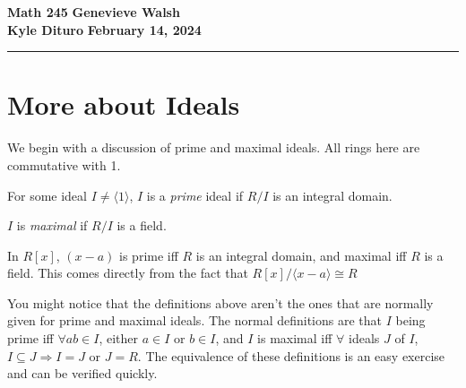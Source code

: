 \documentclass[12pt, twosided]{article}
\begin{document}
\noindent \textbf{Math 245} \hfill \textbf{Genevieve Walsh} \\
\textbf{Kyle Dituro} \hfill \textbf{February 14\tht, 2024}\hrule
\vspace{.2in}

\section{More about Ideals}
We begin with a discussion of prime and maximal ideals. All rings here are commutative with 1.

\begin{df}
  For some ideal \(I \neq \langle 1 \rangle\), \(I\) is a \textit{prime} ideal if \(R/I\) is an integral domain.

  \(I\) is \textit{maximal} if \(R/I\) is a field.
\end{df}

\begin{exa}
  In \(R[x]\), \((x-a)\) is prime iff \(R\) is an integral domain, and maximal iff \(R\) is a field. This comes directly from the fact that \(R[x]/\langle x-a \rangle \cong R\)
\end{exa}

You might notice that the definitions above aren't the ones that are normally given for prime and maximal ideals. The normal definitions are that \(I\) being prime iff \(\forall ab \in I\), either \(a\in I\) or \(b \in I\), and \(I\) is maximal iff \(\forall\) ideals \(J\) of \(I\), \(I \subseteq J \Rightarrow I = J\) or \(J = R\). The equivalence of these definitions is an easy exercise and can be verified quickly.
\end{document}
